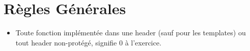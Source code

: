 

\chapter{Règles Générales}


    \begin{itemize}
        \item Toute fonction implémentée dans une header (sauf pour les templates)
            ou tout header non-protégé, signifie 0 à l'exercice.
        

\end{itemize}
